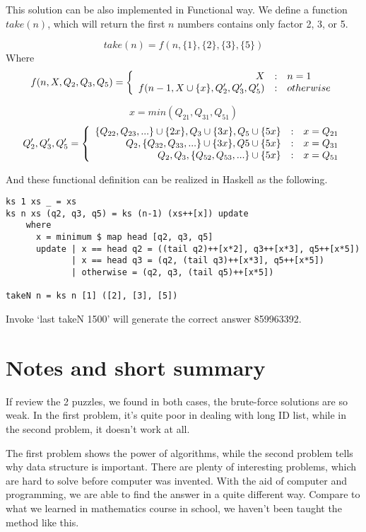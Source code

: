 \documentclass[b5paper]{article}
\begin{document}
This solution can be also implemented in Functional way. We define
a function $take(n)$, which will return the first $n$ numbers contains
only factor 2, 3, or 5.

\[
  take(n) = f(n, \{1\}, \{2\}, \{3\}, \{5\})
\]
Where
\[
 f(n, X, Q_2, Q_3, Q_5) = \left \{
  \begin{array}{r@{\quad:\quad}l}
  X & n = 1 \\
  f(n-1, X \cup \{x\}, Q_2', Q_3', Q_5') & otherwise
  \end{array}
\right.
\]

\[
 x = min(Q_{21}, Q_{31}, Q_{51})
\]
\[
 Q_2', Q_3', Q_5' = \left \{
 \begin{array}{r@{\quad:\quad}l}
 \{Q_{22}, Q_{23}, ...\} \cup \{2x\}, Q_3 \cup \{3x\}, Q_5 \cup \{5x\} & x = Q_{21} \\
 Q_2, \{Q_{32}, Q_{33}, ...\} \cup \{3x\}, Q5 \cup \{5x\} & x = Q_{31} \\
 Q_2, Q_3, \{Q_{52}, Q_{53}, ...\} \cup \{5x\} & x = Q_{51}
 \end{array}
 \right.
\]

And these functional definition can be realized in Haskell as the following.

\lstset{language=Haskell}
\begin{lstlisting}
ks 1 xs _ = xs
ks n xs (q2, q3, q5) = ks (n-1) (xs++[x]) update
    where
      x = minimum $ map head [q2, q3, q5]
      update | x == head q2 = ((tail q2)++[x*2], q3++[x*3], q5++[x*5])
             | x == head q3 = (q2, (tail q3)++[x*3], q5++[x*5])
             | otherwise = (q2, q3, (tail q5)++[x*5])

takeN n = ks n [1] ([2], [3], [5])
\end{lstlisting} %

Invoke `last takeN 1500' will generate the correct answer 859963392.

\section{Notes and short summary}
If review the 2 puzzles, we found in both cases, the brute-force solutions
are so weak. In the first problem, it's quite poor in dealing with
long ID list, while in the second problem, it doesn't work at all.

The first problem shows the power of algorithms, while the second
problem tells why data structure is important. There are plenty
of interesting problems, which are hard to solve before computer
was invented. With the aid of computer and programming, we are able
to find the answer in a quite different way. Compare to what we
learned in mathematics course in school, we haven't been taught the method
like this.
\end{document}
